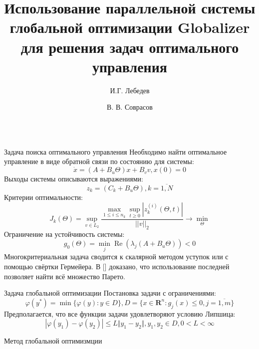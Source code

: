 \documentclass{beamer}
\title{Использование параллельной системы глобальной оптимизации Globalizer для
решения задач оптимального управления}
\author{И.Г. Лебедев \and В. В. Соврасов}
\institute{ННГУ им. Н.И. Лобачевского}
\DeclareMathOperator{\re}{\operatorname{Re}}
\begin{document}
\begin{frame}[t]
    \begin{columns}[t]
        \begin{column}[t]{0.48\paperwidth}
            \begin{block}{Задача поиска оптимального управления}
              Необходимо найти оптимальное управление в виде обратной связи по состоянию для системы:
              \begin{displaymath}
                \dot x = (A+B_u\Theta)x + B_v v, x(0)=0
              \end{displaymath}
              Выходы системы описываются выражениями:
              \begin{displaymath}
                z_k=(C_k+B_u\Theta),k=\overline{1,N}
              \end{displaymath}
              Критерии оптимальности:
              \begin{displaymath}
                J_k(\Theta)=\sup_{v\in L_2} \frac{\max_{1\leqslant i \leqslant n_k} \sup_{t\geqslant 0}|z_k^{(i)}(\Theta,t)|}{||v||_2} \rightarrow\min_{\Theta}
              \end{displaymath}
            Ограничение на устойчивость системы:
            \begin{displaymath}
              g_0(\Theta)=\min_{j}\re(\lambda_j(A+B_u\Theta)) < 0
            \end{displaymath}
            Многокритериальная задача сводится к скалярной методом уступок или с помощью свёртки Гермейера.
            В [] доказано, что использование последней позволяет найти всё множество Парето.
          \end{block}
            \begin{block}{Задача глобальной оптимизации}
              Постановка задачи с ограничениями:
              \begin{displaymath}
                \varphi(y^*)=\min\{\varphi(y):y\in D\}, D=\{x\in \mathbf{R}^n: g_j(x) \leqslant 0, j=\overline{1,m}\}
              \end{displaymath}
              Предполагается, что все функции задачи удовлетворяют условию Липшица:
              \begin{displaymath}
              |\varphi(y_1)-\varphi(y_2)|\leqslant L\Vert y_1-y_2\Vert,y_1,y_2\in D,0<L<\infty
              \end{displaymath}
            \end{block}
            \begin{block}{Метод глобальной оптимизмции}

\end{block}
\end{column}
\end{columns}
\end{frame}
\end{document}
